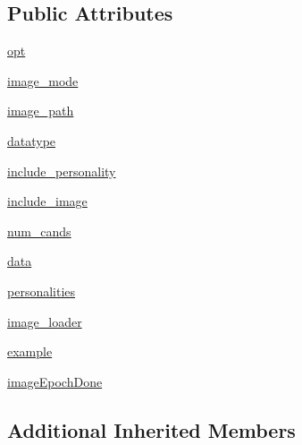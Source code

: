 \subsection*{Public Attributes}
\begin{DoxyCompactItemize}
\item 
\hyperlink{classparlai_1_1tasks_1_1image__chat_1_1agents_1_1ImageChatTeacher_a64b34fbd89f984698409e85197fc6327}{opt}
\item 
\hyperlink{classparlai_1_1tasks_1_1image__chat_1_1agents_1_1ImageChatTeacher_ae8c27447869ad8645b6572994c930a43}{image\+\_\+mode}
\item 
\hyperlink{classparlai_1_1tasks_1_1image__chat_1_1agents_1_1ImageChatTeacher_a76af41b0787179f96a515407deb9a26a}{image\+\_\+path}
\item 
\hyperlink{classparlai_1_1tasks_1_1image__chat_1_1agents_1_1ImageChatTeacher_a3233a84a5603090a6c04cd5e7240c084}{datatype}
\item 
\hyperlink{classparlai_1_1tasks_1_1image__chat_1_1agents_1_1ImageChatTeacher_aa917cf2e0f8b30c042a1d149aed6d16f}{include\+\_\+personality}
\item 
\hyperlink{classparlai_1_1tasks_1_1image__chat_1_1agents_1_1ImageChatTeacher_af20d97f7deded47d8c35ed6cc205d261}{include\+\_\+image}
\item 
\hyperlink{classparlai_1_1tasks_1_1image__chat_1_1agents_1_1ImageChatTeacher_a4cf47d0dacf67e9112521761a8d26318}{num\+\_\+cands}
\item 
\hyperlink{classparlai_1_1tasks_1_1image__chat_1_1agents_1_1ImageChatTeacher_a64d66688a29851c48e88f4c284ab57b6}{data}
\item 
\hyperlink{classparlai_1_1tasks_1_1image__chat_1_1agents_1_1ImageChatTeacher_a3ba9be694ed33f16d9f3b4c6cc3f6a13}{personalities}
\item 
\hyperlink{classparlai_1_1tasks_1_1image__chat_1_1agents_1_1ImageChatTeacher_a9fc07cfbee29595e6b1b52b0855c4888}{image\+\_\+loader}
\item 
\hyperlink{classparlai_1_1tasks_1_1image__chat_1_1agents_1_1ImageChatTeacher_a14105336d54e1f2662fdee38f9e5037e}{example}
\item 
\hyperlink{classparlai_1_1tasks_1_1image__chat_1_1agents_1_1ImageChatTeacher_a081df82b58bd3170bf575070902a4bfb}{image\+Epoch\+Done}
\end{DoxyCompactItemize}
\subsection*{Additional Inherited Members}


